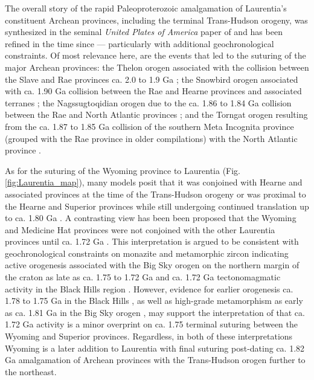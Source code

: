 \documentclass[twocolumn, switch]{article} %
\begin{document}
The overall story of the rapid Paleoproterozoic amalgamation of Laurentia's constituent Archean provinces, including the terminal Trans-Hudson orogeny, was synthesized in the seminal \textit{United Plates of America} paper of \citet{Hoffman1988a} and has been refined in the time since --- particularly with additional geochronological constraints. Of most relevance here, are the events that led to the suturing of the major Archean provinces: the Thelon orogen associated with the collision between the Slave and Rae provinces ca. 2.0 to 1.9 Ga \citep{Hoffman1989c}; the Snowbird orogen associated with ca. 1.90 Ga collision between the Rae and Hearne provinces and associated terranes \citep{Berman2007a, Thiessen2020a}; the Nagssugtoqidian orogen due to the ca. 1.86 to 1.84 Ga collision between the Rae and North Atlantic provinces \citep{St-Onge2009a}; and the Torngat orogen resulting from the ca. 1.87 to 1.85 Ga collision of the southern Meta Incognita province (grouped with the Rae province in older compilations) with the North Atlantic province \citep{St-Onge2009a}.

As for the suturing of the Wyoming province to Laurentia (Fig. \ref{fig:Laurentia_map}), many models posit that it was conjoined with Hearne and associated provinces at the time of the Trans-Hudson orogeny \citep[e.g.][]{St-Onge2009a, Pehrsson2015a} or was proximal to the Hearne and Superior provinces while still undergoing continued translation up to ca. 1.80 Ga \citep{Whitmeyer2007a}. A contrasting view has been been proposed that the Wyoming and Medicine Hat provinces were not conjoined with the other Laurentia provinces until ca. 1.72 Ga \citep{Kilian2016b}. This interpretation is argued to be consistent with geochronological constraints on monazite and metamorphic zircon indicating active orogenesis associated with the Big Sky orogen on the northern margin of the craton as late as ca. 1.75 to 1.72 Ga \citep{Condit2015a} and ca. 1.72 Ga tectonomagmatic activity in the Black Hills region \citep{Redden1990a}. However, evidence for earlier orogenesis ca. 1.78 to 1.75 Ga in the Black Hills \citep{Dahl1999a, Hrncir2017a}, as well as high-grade metamorphism as early as ca. 1.81 Ga in the Big Sky orogen \citep{Condit2015a}, may support the interpretation of \citet{Hrncir2017a} that ca. 1.72 Ga activity is a minor overprint on ca. 1.75 terminal suturing between the Wyoming and Superior provinces. Regardless, in both of these interpretations Wyoming is a later addition to Laurentia with final suturing post-dating ca. 1.82 Ga amalgamation of Archean provinces with the Trans-Hudson orogen further to the northeast. 
\end{document}
